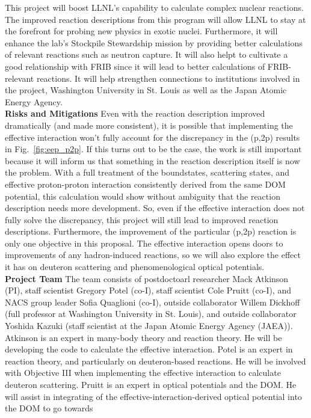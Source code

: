 \documentclass[12pt]{article}
\begin{document}
This project will boost LLNL's capability to calculate complex nuclear reactions. The improved reaction descriptions from this program  will allow LLNL to stay at the forefront for
probing new physics in exotic nuclei. Furthermore, it will enhance the lab's Stockpile Stewardship mission by providing better calculations of relevant reactions such as neutron
capture. It will also helpt to cultivate a good relationship with FRIB since it will lead to better calculations of FRIB-relevant reactions. It will help strengthen connections to
institutions involved in the project, Washington University in St. Louis as well as the Japan Atomic Energy Agency. 
\\
\textbf{Risks and Mitigations}
Even with the reaction description improved dramatically (and made more consistent), it is possible that implementing the effective interaction won't
fully account for the discrepancy in the (p,2p) results in Fig.~\ref{fig:eep_p2p}. If this turns out to be the case, the work is still important because it will inform us that
something in the reaction description itself is now the problem. With a full treatment of the boundstates, scattering states, and effective proton-proton interaction consistently
derived from the same DOM potential, this calculation would show without ambiguity that the reaction description needs more development. So, even if the effective interaction does
not fully solve the discrepancy, this project will still lead to improved reaction descriptions. Furthermore, the improvement of the particular (p,2p) reaction is only one
objective in this proposal. The effective interaction opens doors to improvements of any hadron-induced reactions, so we will also explore the effect it has on deuteron scattering
and phenomenological optical potentials.
\\
\textbf{Project Team} The team consists of postdoctoarl researcher Mack Atkinson (PI), staff scientist Gregory Potel (co-I), staff scientist Cole Pruitt (co-I), and NACS group
leader Sofia Quaglioni (co-I), outside collaborator Willem Dickhoff (full professor at Washington University in St. Louis), and outside collaborator Yoshida Kazuki (staff
scientist at the Japan Atomic Energy Agency (JAEA)). Atkinson is an expert in many-body theory and reaction theory. He will be developing the code to calculate the effective interaction. Potel is an
expert in reaction theory, and particularly on deuteron-based reactions. He will be involved with Objective III when implementing the effective interaction to calculate deuteron
scattering. Pruitt is an expert in optical potentials and the DOM. He will assist in integrating of the effective-interaction-derived optical potential into the DOM to go towards
\end{document}
